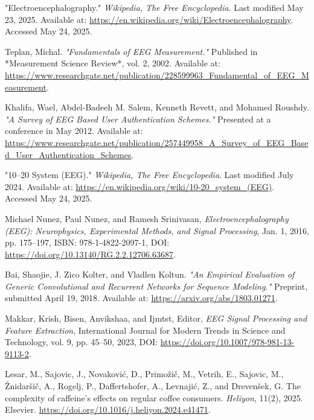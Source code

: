 \documentclass[12pt,a4paper,titlepage,openany]{report}
\begin{document}
\begin{thebibliography}{99}
\thispagestyle{fancy}

     "Electroencephalography." \emph{Wikipedia, The Free Encyclopedia}. 
     Last modified May 23, 2025. Available at: \url{https://en.wikipedia.org/wiki/Electroencephalography}. Accessed May 24, 2025.

     Teplan, Michal. 
     \emph{"Fundamentals of EEG Measurement."} 
     Published in *Measurement Science Review*, vol. 2, 2002. Available at: \url{https://www.researchgate.net/publication/228599963_Fundamental_of_EEG_Measurement}.

     Khalifa, Wael, Abdel-Badeeh M. Salem, Kenneth Revett, and Mohamed Roushdy.  
     \emph{"A Survey of EEG Based User Authentication Schemes."} 
     Presented at a conference in May 2012. Available at: \url{https://www.researchgate.net/publication/257449958_A_Survey_of_EEG_Based_User_Authentication_Schemes}.

    "10--20 System (EEG)." \emph{Wikipedia, The Free Encyclopedia}. Last modified July 2024. Available at: \url{https://en.wikipedia.org/wiki/10-20_system_(EEG)}. Accessed May 24, 2025.
     
     Michael Nunez, Paul Nunez, and Ramesh Srinivasan, 
     \emph{Electroencephalography (EEG): Neurophysics, Experimental Methods, and Signal Processing}, 
     Jan. 1, 2016, pp. 175--197, ISBN: 978-1-4822-2097-1, DOI: \url{https://doi.org/10.13140/RG.2.2.12706.63687}.

     Bai, Shaojie, J. Zico Kolter, and Vladlen Koltun. 
     \emph{"An Empirical Evaluation of Generic Convolutional and Recurrent Networks for Sequence Modeling."} 
     Preprint, submitted April 19, 2018. Available at: \url{https://arxiv.org/abs/1803.01271}.
     
     Makkar, Krish, Bisen, Anvikshaa, and Ijmtst, Editor, 
     \emph{EEG Signal Processing and Feature Extraction}, 
     International Journal for Modern Trends in Science and Technology, vol. 9, pp. 45--50, 2023, 
     DOI: \url{https://doi.org/10.1007/978-981-13-9113-2}.   

    Lesar, M., Sajovic, J., Novaković, D., Primožič, M., Vetrih, E., Sajovic, M., Žnidaršič, A., Rogelj, P., Daffertshofer, A., Levnajić, Z., and Drevenšek, G.
    \newblock The complexity of caffeine's effects on regular coffee consumers.
    \newblock \emph{Heliyon}, 11(2), 2025.
    \newblock Elsevier.
    \newblock \url{https://doi.org/10.1016/j.heliyon.2024.e41471}.


\end{thebibliography}
\end{document}
